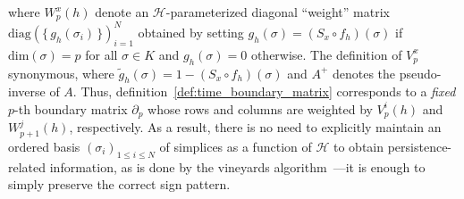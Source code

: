 \documentclass[12pt]{article}
\numberwithin{equation}{section}
\newcommand{\+}{%
	\raisebox{0.18ex}{\scaleobj{0.55}{+}}
}
\theoremstyle{definition}
\begin{document}
where $W_p^x(h)$ denote an $\mathcal{H}$-parameterized diagonal ``weight'' matrix $\mathrm{diag}(\{\, g_h(\sigma_i) \, \})_{i=1}^{N}$ obtained by setting $g_h(\sigma) = (S_x \circ f_h)(\sigma)$ if $\mathrm{dim}(\sigma) = p$ for all $\sigma \in K$ and $g_h(\sigma) = 0$ otherwise. The definition of $V_p^x$ synonymous, where $\tilde{g}_h(\sigma) = 1 - (S_x \circ f_h)(\sigma)$ and $A^+$ denotes the pseudo-inverse of $A$. Thus, definition~\ref{def:time_boundary_matrix} corresponds to a \emph{fixed} $p$-th boundary matrix $\partial_p$ whose rows and columns are weighted by $V_p^i(h)$ and $W_{p+1}^j(h)$, respectively. As a result, there is no need to explicitly maintain an ordered basis $(\sigma_i)_{1 \leq i \leq N}$ of simplices as a function of $\mathcal{H}$ to obtain persistence-related information, as is done by the vineyards algorithm~\cite{cohen2006vines}---it is enough to simply preserve the correct sign pattern.


\end{document}
